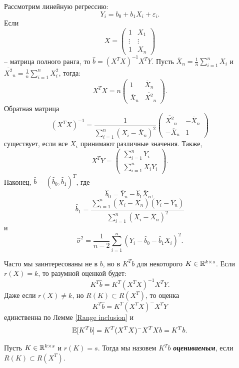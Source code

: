 \begin{exmp}
	Рассмотрим линейную регрессию:
	\[ Y_i = b_0 + b_1 X_i + \varepsilon_i.\]
	Если 
	\[X = \begin{pmatrix}
	1 & X_1 \\
	\vdots &  \vdots \\
	1 & X_n
	\end{pmatrix}\]
	-- матрица полного ранга, то $\hat{b} = (X^TX)^{-1}X^TY$. Пусть $\overline{X}_n = \frac{1}{n}\sum_{i=1}^{n}X_i$ и $\overline{X^2}_n = \frac{1}{n}\sum_{i=1}^{n}X_i^2$, тогда:
	\[ X^TX = n \begin{pmatrix}
	1 & \overline{X}_n \\
	\overline{X}_n & \overline{X^2}_n
	\end{pmatrix}. \]
	Обратная матрица
	\[ (X^TX)^{-1} = \frac{1}{\sum_{i=1}^{n}(X_i - \overline{X}_n)^2} \begin{pmatrix}
	\overline{X^2}_n & -\overline{X}_n \\
	-\overline{X}_n & 1
	\end{pmatrix}  \]
	существует, если все $X_i$ принимают различные значения. Также,
	\[ X^TY = \begin{pmatrix}
	\sum_{i=1}^{n} Y_i \\
	\sum_{i=1}^{n} X_iY_i
	\end{pmatrix}. \]
	Наконец, $\hat{b} = (\hat{b}_0, \hat{b}_1)^T$, где
	\[ \hat{b}_0  = \overline{Y}_n - \hat{b}_1\overline{X}_n, \]
	\[ \hat{b}_1 = \frac{\sum_{i=1}^{n} (X_i - \overline{X}_n)(Y_i - \overline{Y}_n) }{\sum_{i=1}^{n} (X_i - \overline{X}_n)^2} \]
	и
	\[ \hat{\sigma}^2 = \frac{1}{n-2} \sum_{i=1}^{n} (Y_i - \hat{b}_0 - \hat{b}_1 X_i )^2.  \]
\end{exmp}

\begin{rmrk}
	Часто мы заинтересованы не в $b$, но в $K^Tb$ для некоторого $K \in \mathbb{R}^{k \times s}$. Если $r(X) = k$, то разумной оценкой будет:
	\[ K^T\hat{b} = K^T(X^TX)^{-1}X^TY. \]
	Даже если $r(X) \neq k$, но $R(K) \subset R(X^T)$, то оценка
	\[ K^T\hat{b} = K^T(X^TX)^{-}X^TY \]
	единственна по Лемме \ref{Range inclusion} и
	\[\mathbb{E}[K^Tb] = K^T(X^TX)^-X^TXb = K^Tb. \]
\end{rmrk}

\begin{defn}
	Пусть $K \in \mathbb{R}^{k \times s}$ и $r(K) = s$. Тогда мы назовем $K^Tb$ \textbf{\textit{оцениваемым}}, если $R(K) \subset R(X^T)$.
\end{defn}

